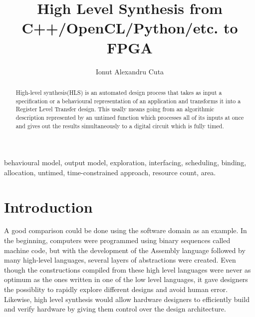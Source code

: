 \documentclass{romjist}
\begin{document}
      
    \title{High Level Synthesis from C++/OpenCL/Python/etc. to FPGA}

    \author[1]{Ionut Alexandru Cuta}%
    

 
    \maketitle
    
    \begin{abstract} \quad High-level synthesis(HLS) is an automated design process that takes as input a specification or a behavioural representation of an application and transforms it into a Register Level Transfer design. This usally means going from an algorithmic description represented by an untimed function which processes all of its inputs at once and gives out the results simultaneously to a digital circuit which is fully timed.
    \end{abstract}
    
    \begin{keywords} 
    \quad behavioural model, output model, exploration, interfacing, scheduling, binding, allocation, untimed, time-constrained approach, resource count, area.
    \end{keywords}

\section{Introduction}



\quad A good comparison could be done using the software domain as an example. In the beginning, computers were programmed using binary sequences called machine code, but with the development of the Assembly language followed by many high-level languages, several layers of abstractions were created. Even though the constructions compiled from these high level languages were never as optimum as the ones written in one of the low level languages, it gave designers the possiblity to rapidly explore different designs and avoid human error. \\ 
Likewise, high level synthesis would allow hardware designers to  efficiently build and verify hardware by giving them control over the design architecture. 
\end{document}
